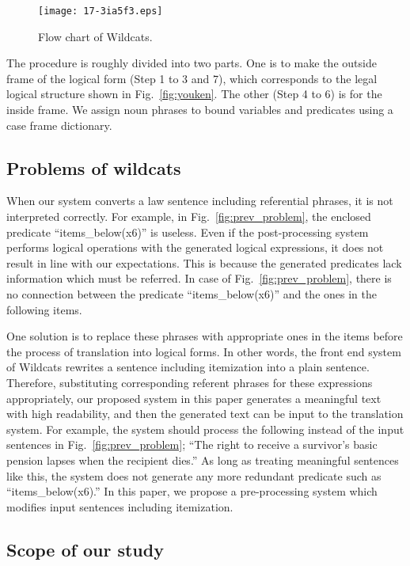 \documentclass[english]{jnlp_1.4}
\begin{document}
\begin{figure}[t]
\begin{center}
\texttt{[image: 17-3ia5f3.eps]}
\end{center}
\caption{Flow chart of Wildcats.}
\label{fig:flow}
\end{figure}


The procedure is roughly divided into two parts.
One is to make the outside frame of the logical form (Step 1 to 3 and 7),
which corresponds to the legal logical structure shown in Fig.~\ref{fig:youken}.
The other (Step 4 to 6) is for the inside frame. We assign noun phrases to bound
variables and predicates using a case frame dictionary.


\subsection{Problems of wildcats}

When our system converts a law sentence including referential phrases,
it is not interpreted correctly.
For example, in Fig.~\ref{fig:prev_problem}, the enclosed predicate
``items\_below(x6)'' is useless.
Even if the post-processing system performs logical operations with the
generated logical expressions, it does not result in line with our expectations.
This is because the generated predicates lack information which must
be referred.
In case of Fig.~\ref{fig:prev_problem}, there is no connection between
the predicate ``items\_below(x6)'' and the ones in the following items.

One solution is to replace these phrases with appropriate ones in the
items before the process of translation into logical forms.
In other words, the front end system of Wildcats rewrites a
sentence including itemization into a plain sentence.
Therefore, substituting corresponding referent phrases for these
expressions appropriately, our proposed system in this paper generates a
meaningful text with high readability, and then the generated text can
be input to the translation system.
For example, the system should process the following instead of the
input sentences in Fig.~\ref{fig:prev_problem}; ``The right to receive a
survivor's basic pension lapses when the recipient dies.''
As long as treating meaningful sentences like this, the system does not generate
any more redundant predicate such as ``items\_below(x6).''
In this paper, we propose a pre-processing system which modifies input
sentences including itemization.


\subsection{Scope of our study}
\end{document}
